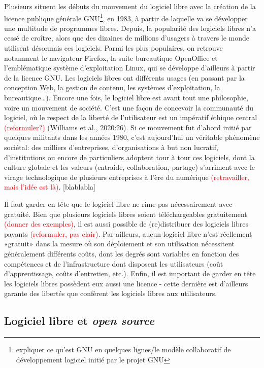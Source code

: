 \documentclass[
  letterpaper,
]{scrbook}
\begin{document}
Plusieurs situent les débuts du mouvement du logiciel libre avec la
création de la licence publique générale GNU\footnote{expliquer ce
  qu'est GNU en quelques lignes/le modèle collaboratif de développement
  logiciel initié par le projet GNU}, en 1983, à partir de laquelle va
se développer une multitude de programmes libres. Depuis, la popularité
des logiciels libres n'a cessé de croître, alors que des dizaines de
millions d'usagers à travers le monde utilisent désormais ces logiciels.
Parmi les plus populaires, on retrouve notamment le navigateur Firefox,
la suite bureautique OpenOffice et l'emblématique système d'exploitation
Linux, qui se développe d'ailleurs à partir de la licence GNU. Les
logiciels libres ont différents usages (en passant par la conception
Web, la gestion de contenu, les systèmes d'exploitation, la
bureautique\ldots). Encore une fois, le logiciel libre est avant tout
une philosophie, voire un mouvement de société. C'est une façon de
concevoir la communauté du logiciel, où le respect de la liberté de
l'utilisateur est un impératif éthique central
\textcolor{red}{(reformuler?)} (Williams et al., 2020:26). Si ce
mouvement fut d'abord initié par quelques militants dans les années
1980, c'est aujourd'hui un véritable phénomène sociétal: des milliers
d'entreprises, d'organisations à but non lucratif, d'institutions ou
encore de particuliers adoptent tour à tour ces logiciels, dont la
culture globale et les valeurs (entraide, collaboration, partage)
s'arriment avec le virage technologique de plusieurs entreprises à l'ère
du numérique \textcolor{red}{(retravailler, mais l'idée est là)}.
{[}blablabla{]}

Il faut garder en tête que le logiciel libre ne rime pas nécessairement
avec gratuité. Bien que plusieurs logiciels libres soient
téléchargeables gratuitement \textcolor{red}{(donner des exemples)}, il
est aussi possible de (re)distribuer des logiciels libres payants
\textcolor{red}{(reformuler, pas clair)}. Par ailleurs, aucun logiciel
libre n'est réellement «gratuit» dans la mesure où son déploiement et
son utilisation nécessitent généralement différents coûts, dont les
degrés sont variables en fonction des compétences et de l'infrastructure
dont disposent les utilisateurs (coût d'apprentissage, coûts
d'entretien, etc.). Enfin, il est important de garder en tête les
logiciels libres possèdent eux aussi une licence - cette dernière est
d'ailleurs garante des libertés que confèrent les logiciels libres aux
utilisateurs.

\hypertarget{logiciel-libre-et-open-source}{%
\subsection{\texorpdfstring{Logiciel libre et \emph{open
source}}{Logiciel libre et open source}}\label{logiciel-libre-et-open-source}}
\end{document}
